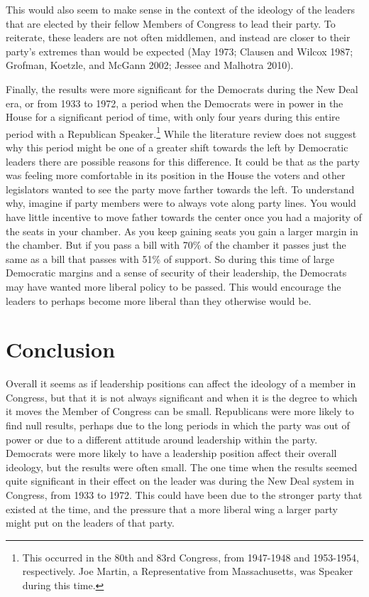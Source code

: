 \documentclass[12pt,twoside]{reedthesis}
\begin{document}
  This would also seem to make sense in the context of the ideology of the
  leaders that are elected by their fellow Members of Congress to lead
  their party. To reiterate, these leaders are not often middlemen, and
  instead are closer to their party's extremes than would be expected (May
  1973; Clausen and Wilcox 1987; Grofman, Koetzle, and McGann 2002; Jessee
  and Malhotra 2010).
  
  Finally, the results were more significant for the Democrats during the
  New Deal era, or from 1933 to 1972, a period when the Democrats were in
  power in the House for a significant period of time, with only four
  years during this entire period with a Republican
  Speaker.\footnote{This occurred in the 80th and 83rd Congress, from 1947-1948 and 1953-1954, respectively. Joe Martin, a Representative from Massachusetts, was Speaker during this time.}
  While the literature review does not suggest why this period might be
  one of a greater shift towards the left by Democratic leaders there are
  possible reasons for this difference. It could be that as the party was
  feeling more comfortable in its position in the House the voters and
  other legislators wanted to see the party move farther towards the left.
  To understand why, imagine if party members were to always vote along
  party lines. You would have little incentive to move father towards the
  center once you had a majority of the seats in your chamber. As you keep
  gaining seats you gain a larger margin in the chamber. But if you pass a
  bill with 70\% of the chamber it passes just the same as a bill that
  passes with 51\% of support. So during this time of large Democratic
  margins and a sense of security of their leadership, the Democrats may
  have wanted more liberal policy to be passed. This would encourage the
  leaders to perhaps become more liberal than they otherwise would be.
  
  \section{Conclusion}\label{conclusion-1}
  
  Overall it seems as if leadership positions can affect the ideology of a
  member in Congress, but that it is not always significant and when it is
  the degree to which it moves the Member of Congress can be small.
  Republicans were more likely to find null results, perhaps due to the
  long periods in which the party was out of power or due to a different
  attitude around leadership within the party. Democrats were more likely
  to have a leadership position affect their overall ideology, but the
  results were often small. The one time when the results seemed quite
  significant in their effect on the leader was during the New Deal system
  in Congress, from 1933 to 1972. This could have been due to the stronger
  party that existed at the time, and the pressure that a more liberal
  wing a larger party might put on the leaders of that party.
  
\end{document}

